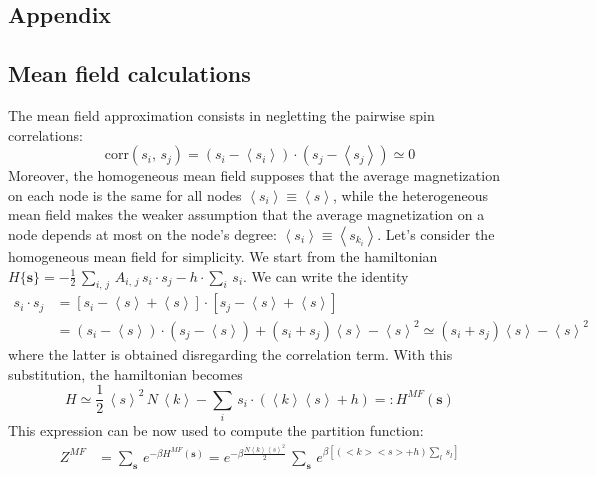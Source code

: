 \newpage
\subsection*{Appendix}
\subsection*{Mean field calculations} \label{app:mean_field}
{\small
The mean field approximation consists in negletting the pairwise spin correlations:
\begin{equation*}
    \text{corr}(s_i,\,s_j) = (s_i - \left\langle s_i \right \rangle)\cdot (s_j - \left\langle s_j \right \rangle)\simeq 0
\end{equation*}
Moreover, the homogeneous mean field supposes that the average magnetization on each node is the same for all nodes $\left\langle s_i\right\rangle \equiv \left \langle s \right \rangle$, while the heterogeneous mean field makes the weaker assumption that the average magnetization on a node depends at most on the node's degree: $\left \langle s_i\right \rangle \equiv \left\langle s_{k_i}\right\rangle$. 
Let's consider the homogeneous mean field for simplicity. We start from the hamiltonian $H\{\mathbf{s}\} = -\frac{1}{2}\, \sum_{i,\,j}\,A_{i,\,j}\,s_i\cdot s_j - h\cdot\sum_{i}\,s_i$. We can write the identity 
\begin{align*}
    s_i\cdot s_j &= [s_i - \left\langle s \right \rangle + \left\langle s \right \rangle]\cdot [s_j - \left\langle s \right \rangle + \left\langle s \right \rangle] \\
    &= (s_i - \left\langle s \right \rangle)\cdot (s_j-\left\langle s \right \rangle) + (s_i + s_j) \left\langle s \right \rangle - \left\langle s \right \rangle^2 \simeq (s_i + s_j) \left\langle s \right \rangle - \left\langle s \right \rangle^2
\end{align*} where the latter is obtained disregarding the correlation term. With this substitution, the hamiltonian becomes 
\begin{equation*}
    H \simeq\frac{1}{2}\,\left\langle s \right \rangle^2\,N\,\left\langle k \right \rangle - \sum_i\,s_i\cdot (\left\langle k \right \rangle\left\langle s \right \rangle + h)=: H^{MF}(\mathbf{s})
\end{equation*}
This expression can be now used to compute the partition function:
\begin{align*}
    Z^{MF} &= \sum_{\mathbf{s}}\, e^{-\beta H^{MF}(\mathbf{s})} = e^{-\beta \frac{N \left\langle k \right \rangle\left\langle s \right \rangle^2}{2}}\, \sum_{\mathbf{s}}\, e^{\beta\left[(<k><s> + h)\sum_l\,s_l\right]} \\

\end{align*}}
